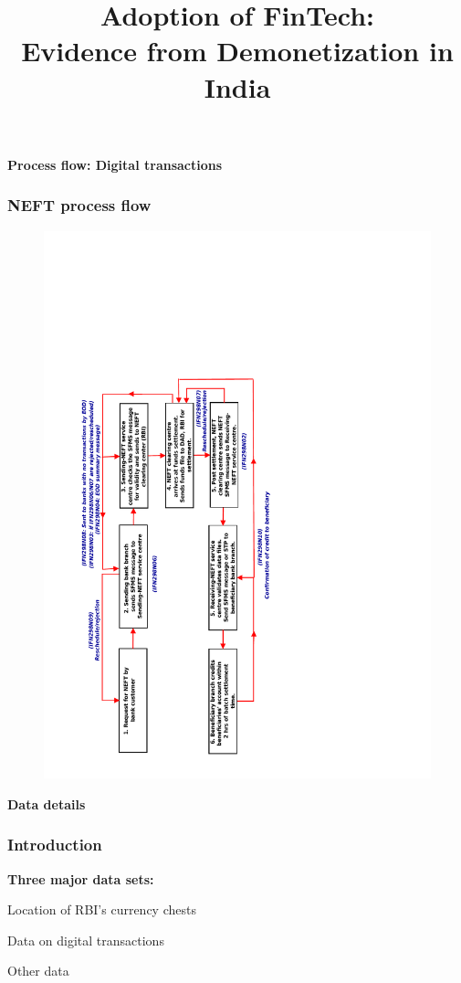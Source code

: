 \documentclass{beamer}\usepackage[]{graphicx}\usepackage[]{color}
\title{Adoption of FinTech:\\ Evidence from Demonetization in India}
\newcommand{\fullpage}[1]{
  \begin{frame}

    \begin{center}
      {\Large \textbf{#1}}
    \end{center}

  \end{frame}
}
\begin{document}
\maketitle

\fullpage{Process flow: Digital transactions}

\begin{frame}
  \frametitle{NEFT process flow}
  \begin{figure}
    \begin{center}
    \includegraphics[scale = 0.5, angle = 270]{GRAPHS/neft_process_flow.pdf}
    \end{center}
  \end{figure}
\end{frame}

\fullpage{Data details}

\begin{frame}
  \frametitle{Introduction}
  \begin{footnotesize}
    \bf{Three major data sets:} 
    \begin{itemize}
      \begin{footnotesize}
      \item Location of RBI's currency chests
      \item Data on digital transactions
      \item Other data
      \end{footnotesize}
    \end{itemize}
  \end{footnotesize}
\end{frame}
\end{document}
